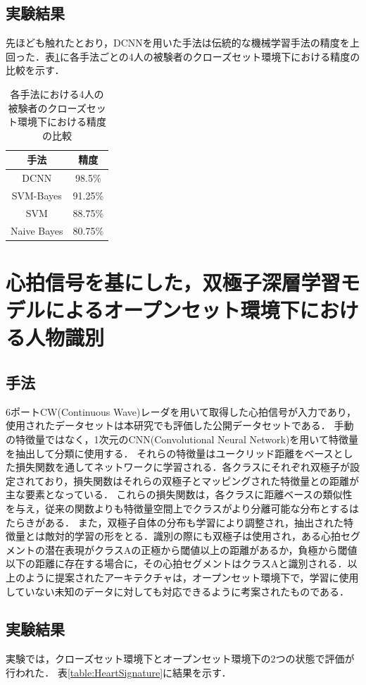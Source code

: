 \subsection{実験結果}
先ほども触れたとおり，DCNNを用いた手法は伝統的な機械学習手法の精度を上回った．表\ref{table:HeartID}に各手法ごとの4人の被験者のクローズセット環境下における精度の比較を示す．

\begin{table}[H]
\caption{各手法における4人の被験者のクローズセット環境下における精度の比較}
\centering
\begin{tabular}{cc}
\hline
手法 & 精度 \\
\hline
DCNN & 98.5\% \\
SVM-Bayes & 91.25\% \\
SVM & 88.75\% \\
Naive Bayes & 80.75\% \\
\hline
\end{tabular}
\label{table:HeartID}
\end{table}

\section{心拍信号を基にした，双極子深層学習モデルによるオープンセット環境下における人物識別\cite{paper:HeartSignature}}
\subsection{手法}
6ポートCW(Continuous Wave)レーダを用いて取得した心拍信号が入力であり，使用されたデータセットは本研究でも評価した公開データセットである．
手動の特徴量ではなく，1次元のCNN(Convolutional Neural Network)を用いて特徴量を抽出して分類に使用する．
それらの特徴量はユークリッド距離をベースとした損失関数を通してネットワークに学習される．各クラスにそれぞれ双極子が設定されており，損失関数はそれらの双極子とマッピングされた特徴量との距離が主な要素となっている．
これらの損失関数は，各クラスに距離ベースの類似性を与え，従来の関数よりも特徴量空間上でクラスがより分離可能な分布とするはたらきがある．
また，双極子自体の分布も学習により調整され，抽出された特徴量とは敵対的学習の形をとる．識別の際にも双極子は使用され，ある心拍セグメントの潜在表現がクラスAの正極から閾値以上の距離があるか，負極から閾値以下の距離に存在する場合に，その心拍セグメントはクラスAと識別される．以上のように提案されたアーキテクチャは，オープンセット環境下で，学習に使用していない未知のデータに対しても対応できるように考案されたものである．

\subsection{実験結果}
実験では，クローズセット環境下とオープンセット環境下の2つの状態で評価が行われた．
表\ref{table:HeartSignature}に結果を示す．

